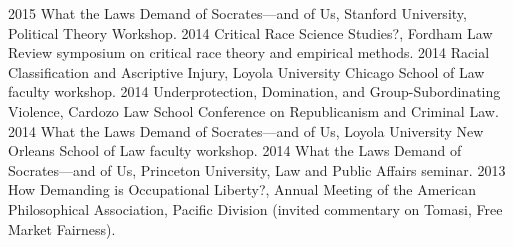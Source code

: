 \documentclass[letterpaper]{moderncv}
\begin{document}
\vspace{1mm}
\cvitem
{2015}
{What the Laws Demand of Socrates---and of Us, Stanford University, Political Theory Workshop.}
\vspace{1mm}
\cvitem
{2014}
{Critical Race Science Studies?, Fordham Law Review symposium on critical race theory and empirical methods.}
\vspace{1mm}
\cvitem
{2014}
{Racial Classification and Ascriptive Injury, Loyola University Chicago School of Law faculty workshop.}
\vspace{1mm}
\cvitem
{2014}
{Underprotection, Domination, and Group-Subordinating Violence, Cardozo Law School Conference on Republicanism and Criminal Law.}
\vspace{1mm}
\cvitem
{2014}
{What the Laws Demand of Socrates---and of Us, Loyola University New Orleans School of Law faculty workshop.}
\vspace{1mm}
\cvitem
{2014}
{What the Laws Demand of Socrates---and of Us, Princeton University, Law and Public Affairs seminar.}
\vspace{1mm}
\cvitem
{2013}
{How Demanding is Occupational Liberty?, Annual Meeting of the American Philosophical Association, Pacific Division (invited commentary on Tomasi, Free Market Fairness).}
\vspace{1mm}
\end{document}
